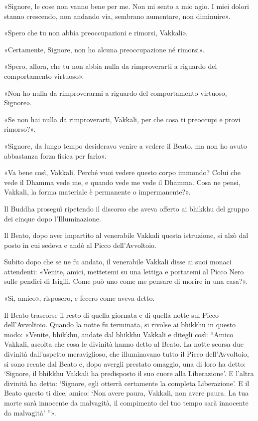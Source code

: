 «Signore, le cose non vanno bene per me. Non mi sento a mio agio. I miei dolori
stanno crescendo, non andando via, sembrano aumentare, non diminuire».

«Spero che tu non abbia preoccupazioni e rimorsi, Vakkali».

«Certamente, Signore, non ho alcuna preoccupazione né rimorsi».

«Spero, allora, che tu non abbia nulla da rimproverarti a riguardo del
comportamento virtuoso».

«Non ho nulla da rimproverarmi a riguardo del comportamento virtuoso, Signore».

«Se non hai nulla da rimproverarti, Vakkali, per che cosa ti preoccupi e provi
rimorso?».

«Signore, da lungo tempo desideravo venire a vedere il Beato, ma non ho avuto
abbastanza forza fisica per farlo».

«Va bene così, Vakkali. Perché vuoi vedere questo corpo immondo? Colui che vede
il Dhamma vede me, e quando vede me vede il Dhamma. Cosa ne pensi, Vakkali, la
forma materiale è permanente o impermanente?».

 Il Buddha proseguì ripetendo il discorso che aveva
offerto ai bhikkhu del gruppo dei cinque dopo l’Illuminazione.

 Il Beato, dopo aver impartito al venerabile Vakkali questa
istruzione, si alzò dal posto in cui sedeva e andò al Picco dell’Avvoltoio.

Subito dopo che se ne fu andato, il venerabile Vakkali disse ai suoi monaci
attendenti: «Venite, amici, mettetemi su una lettiga e portatemi al Picco Nero
sulle pendici di Isigili. Come può uno come me pensare di morire in una casa?».

«Sì, amico», risposero, e fecero come aveva detto.

Il Beato trascorse il resto di quella giornata e di quella notte sul Picco
dell’Avvoltoio. Quando la notte fu terminata, si rivolse ai bhikkhu in questo
modo: «Venite, bhikkhu, andate dal bhikkhu Vakkali e ditegli così: “Amico
Vakkali, ascolta che cosa le divinità hanno detto al Beato. La notte scorsa due
divinità dall’aspetto meraviglioso, che illuminavano tutto il Picco
dell’Avvoltoio, si sono recate dal Beato e, dopo avergli prestato omaggio, una
di loro ha detto: ‘Signore, il bhikkhu Vakkali ha predisposto il suo cuore alla
Liberazione’. E l’altra divinità ha detto: ‘Signore, egli otterrà certamente la
completa Liberazione’. E il Beato questo ti dice, amico: ‘Non avere paura,
Vakkali, non avere paura. La tua morte sarà innocente da malvagità, il
compimento del tuo tempo sarà innocente da malvagità’ ”».

